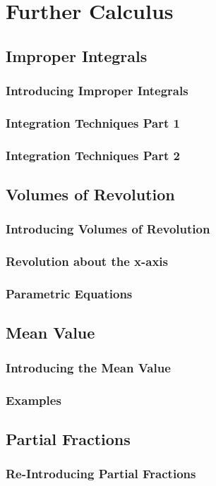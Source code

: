 \documentclass[../maths.tex]{subfiles}
\begin{document}
\chapter{Further Calculus}
\section{Improper Integrals}
\subsection*{Introducing Improper Integrals}
\subsection*{Integration Techniques Part 1}
\subsection*{Integration Techniques Part 2}
\section{Volumes of Revolution}
\subsection*{Introducing Volumes of Revolution}
\subsection*{Revolution about the x-axis}
\subsection*{Parametric Equations}
\section{Mean Value}
\subsection*{Introducing the Mean Value}
\subsection*{Examples}
\section{Partial Fractions}
\subsection*{Re-Introducing Partial Fractions}
\end{document}

